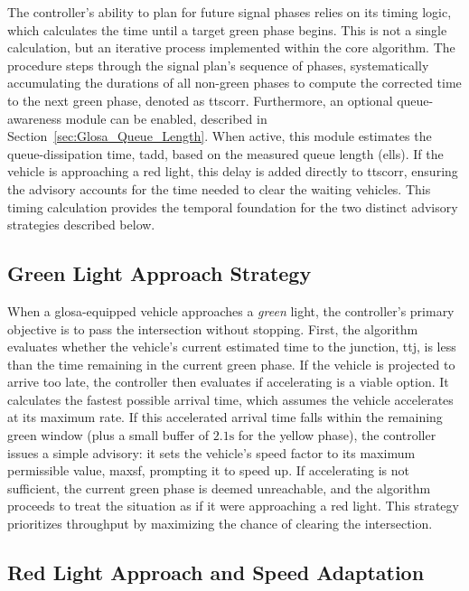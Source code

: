 The controller's ability to plan for future signal phases relies on its timing logic, which calculates the time until a target green phase begins. This is not a single calculation, but an iterative process implemented within the core algorithm. The procedure steps through the signal plan's sequence of phases, systematically accumulating the durations of all non-green phases to compute the corrected time to the next green phase, denoted as \gls{ttscorr}.
\mynewline
Furthermore, an optional queue-awareness module can be enabled, described in Section~\vref{sec:Glosa_Queue_Length}. When active, this module estimates the queue-dissipation time, \gls{tadd}, based on the measured queue length (\gls{ells}). If the vehicle is approaching a red light, this delay is added directly to \gls{ttscorr}, ensuring the advisory accounts for the time needed to clear the waiting vehicles. This timing calculation provides the temporal foundation for the two distinct advisory strategies described below.

\subsection{Green Light Approach Strategy}
\label{sec:Glosa_Green_Light_Strategy}

When a \ac{glosa}-equipped vehicle approaches a \textit{green} light, the controller's primary objective is to pass the intersection without stopping. First, the algorithm evaluates whether the vehicle’s current estimated time to the junction, \gls{ttj}, is less than the time remaining in the current green phase.
\mynewline
If the vehicle is projected to arrive too late, the controller then evaluates if accelerating is a viable option. It calculates the fastest possible arrival time, which assumes the vehicle accelerates at its maximum rate. If this accelerated arrival time falls within the remaining green window (plus a small buffer of $2.1\unit{\second}$ for the yellow phase), the controller issues a simple advisory: it sets the vehicle's speed factor to its maximum permissible value, \gls{maxsf}, prompting it to speed up. If accelerating is not sufficient, the current green phase is deemed unreachable, and the algorithm proceeds to treat the situation as if it were approaching a red light. This strategy prioritizes throughput by maximizing the chance of clearing the intersection.

\subsection{Red Light Approach and Speed Adaptation}
\label{sec:Glosa_Red_Light_Strategy}

